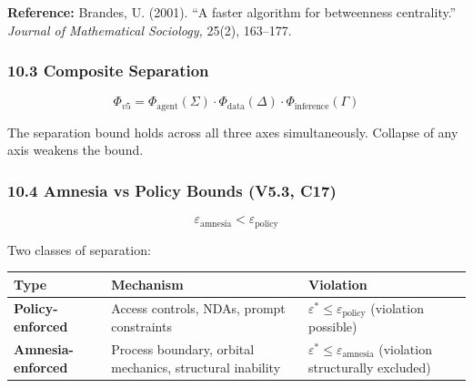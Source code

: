 \documentclass[
  11pt,
]{article}
\newcounter{none} %
\begin{document}
\textbf{Reference:} Brandes, U. (2001). ``A faster algorithm for
betweenness centrality.'' \emph{Journal of Mathematical Sociology,}
25(2), 163--177.

\subsubsection{10.3 Composite Separation}\label{composite-separation}

\[\Phi_{v5} = \Phi_{\text{agent}}(\Sigma) \cdot \Phi_{\text{data}}(\Delta) \cdot \Phi_{\text{inference}}(\Gamma)\]

The separation bound holds across all three axes simultaneously.
Collapse of any axis weakens the bound.

\subsubsection{10.4 Amnesia vs Policy Bounds (V5.3,
C17)}\label{amnesia-vs-policy-bounds-v5.3-c17}

\[\varepsilon_{\text{amnesia}} < \varepsilon_{\text{policy}}\]

Two classes of separation:

{\def\LTcaptype{none} %
\begin{longtable}[]{@{}
  >{\raggedright\arraybackslash}p{}
  >{\raggedright\arraybackslash}p{}
  >{\raggedright\arraybackslash}p{}@{}}
\toprule\noalign{}
\begin{minipage}[b]{\linewidth}\raggedright
Type
\end{minipage} & \begin{minipage}[b]{\linewidth}\raggedright
Mechanism
\end{minipage} & \begin{minipage}[b]{\linewidth}\raggedright
Violation
\end{minipage} \\
\midrule\noalign{}
\endhead
\bottomrule\noalign{}
\endlastfoot
\textbf{Policy-enforced} & Access controls, NDAs, prompt constraints &
\(\varepsilon^* \leq \varepsilon_{\text{policy}}\) (violation
possible) \\
\textbf{Amnesia-enforced} & Process boundary, orbital mechanics,
structural inability &
\(\varepsilon^* \leq \varepsilon_{\text{amnesia}}\) (violation
structurally excluded) \\
\end{longtable}
}
\end{document}
